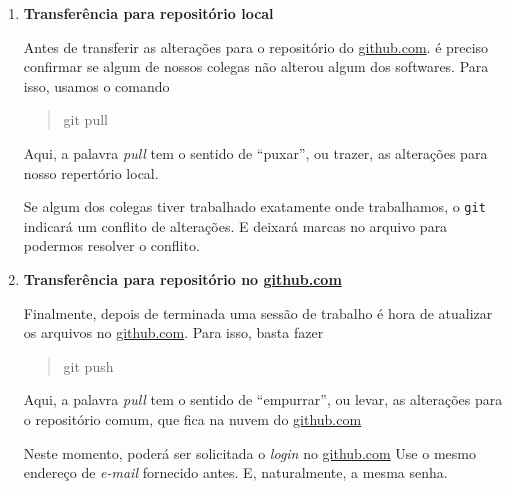 \documentclass[10pt,a4paper]{article}
\begin{document}
\begin{enumerate}
	Esta mensagem será essencial para entendermos as alterações efetuadas quando estivermos 
	lendo o histórico do projeto -- por exemplo, para descobrir onde surgiu um {\em bug} no 
	código.
	
    \item \label{itm:UpdateFromRemote}
	{\bf Transferência para repositório local}
        
        Antes de transferir as alterações para o repositório do \url{github.com}. é preciso 
	confirmar se algum de nossos colegas não alterou algum dos softwares. Para isso, usamos o 
	comando 
	\begin{quote}
	\begin{tt}
	    git pull
	\end{tt}
	\end{quote}
	Aqui, a palavra {\em pull} tem o sentido de ``puxar'', ou trazer, as alterações para nosso
	repertório local.
	
	Se algum dos colegas tiver trabalhado exatamente onde trabalhamos, o {\tt git} indicará um 
	conflito de alterações. E deixará marcas no arquivo para podermos resolver o conflito. 
        
    \item \label{itm:UpdateFromLocal}
	{\bf Transferência para repositório no \url{github.com}}
	
	Finalmente, depois de terminada uma sessão de trabalho é hora de atualizar os arquivos no 
	\url{github.com}. Para isso, basta fazer 
	\begin{quote}
	\begin{tt}
	    git push
	\end{tt}
	\end{quote}
	Aqui, a palavra {\em pull} tem o sentido de ``empurrar'', ou levar, as alterações para o
	repositório comum, que fica na nuvem do \url{github.com}
	
	Neste momento, poderá ser solicitada o {\em login} no \url{github.com} Use o mesmo endereço
	de {\em e-mail} fornecido antes. E, naturalmente, a mesma senha.
        
\end{enumerate}
\end{document}
